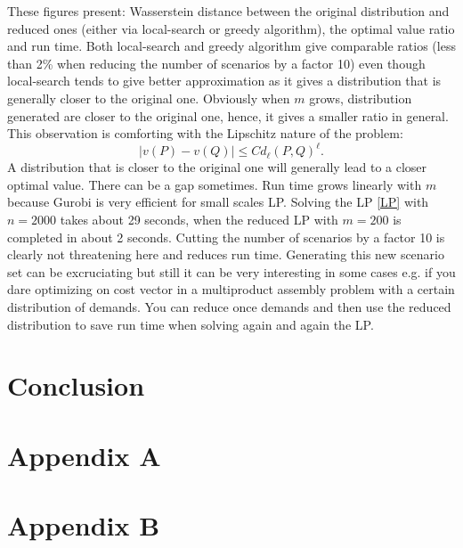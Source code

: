 \documentclass{amsart}
\begin{document}
These figures present: Wasserstein distance between the original distribution and reduced ones (either via local-search or greedy algorithm), the optimal value ratio and run time. Both local-search and greedy algorithm give comparable ratios (less than 2\% when reducing the number of scenarios by a factor 10) even though local-search tends to give better approximation as it gives a distribution that is generally closer to the original one. Obviously when $m$ grows, distribution generated are closer to the original one, hence, it gives a smaller ratio in general. This observation is comforting with the Lipschitz nature of the problem: $$\lvert v\left(P\right)-v\left(Q\right)\rvert \leq C d_\ell\left(P,Q\right)^\ell.$$ A distribution that is closer to the original one will generally lead to a closer optimal value. There can be a gap sometimes. Run time grows linearly with $m$ because Gurobi is very efficient for small scales LP. Solving the LP \ref{LP} with $n=2000$ takes about 29 seconds, when the reduced LP with $m=200$ is completed in about 2 seconds. Cutting the number of scenarios by a factor 10 is clearly not threatening here and reduces run time. Generating this new scenario set can be excruciating but still it can be very interesting in some cases e.g. if you dare optimizing on cost vector in a multiproduct assembly problem with a certain distribution of demands. You can reduce once demands and then use the reduced distribution to save run time when solving again and again the LP.
\section{Conclusion}
\clearpage


\clearpage
\appendix

\section*{Appendix A}

\section*{Appendix B}
\end{document}
